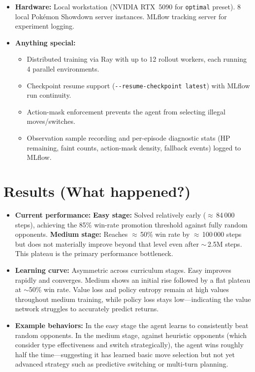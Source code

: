 \documentclass[11pt, a4paper]{article}
\begin{document}
\begin{itemize}
    \item \textbf{Hardware:}
        Local workstation (NVIDIA RTX~5090 for \texttt{optimal} preset). 8 local Pok\'{e}mon Showdown server instances. MLflow tracking server for experiment logging.

    \item \textbf{Anything special:}
        \begin{itemize}
            \item Distributed training via Ray with up to 12 rollout workers, each running 4 parallel environments.
            \item Checkpoint resume support (\texttt{-{}-resume-checkpoint latest}) with MLflow run continuity.
            \item Action-mask enforcement prevents the agent from selecting illegal moves/switches.
            \item Observation sample recording and per-episode diagnostic stats (HP remaining, faint counts, action-mask density, fallback events) logged to MLflow.
        \end{itemize}
\end{itemize}

\section{Results (What happened?)}
\begin{itemize}
    \item \textbf{Current performance:}
        \textbf{Easy stage:} Solved relatively early ($\approx$\,84\,000 steps), achieving the 85\% win-rate promotion threshold against fully random opponents.
        \textbf{Medium stage:} Reaches $\approx$\,50\% win rate by $\approx$\,100\,000 steps but does not materially improve beyond that level even after $\sim$\,2.5M steps. This plateau is the primary performance bottleneck.

    \item \textbf{Learning curve:}
        Asymmetric across curriculum stages. Easy improves rapidly and converges. Medium shows an initial rise followed by a flat plateau at $\sim$50\% win rate. Value loss and policy entropy remain at high values throughout medium training, while policy loss stays low---indicating the value network struggles to accurately predict returns.

    \item \textbf{Example behaviors:}
        In the easy stage the agent learns to consistently beat random opponents. In the medium stage, against heuristic opponents (which consider type effectiveness and switch strategically), the agent wins roughly half the time---suggesting it has learned basic move selection but not yet advanced strategy such as predictive switching or multi-turn planning.
\end{itemize}
\end{document}
